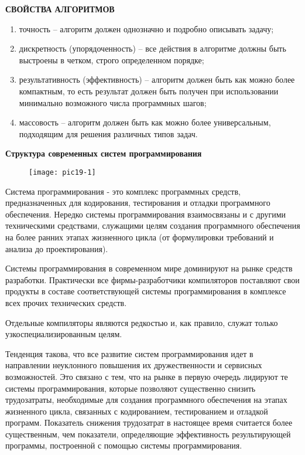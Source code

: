 \begin{center}{\bfseries СВОЙСТВА АЛГОРИТМОВ}
\end{center}

\begin{enumerate}
  \item точность – алгоритм должен однозначно и подробно описывать задачу;
  \item дискретность (упорядоченность) – все действия в алгоритме должны быть выстроены в четком, строго определенном порядке;
  \item результативность (эффективность) – алгоритм должен быть как можно более компактным, то есть результат должен быть получен при использовании минимально возможного числа программных шагов;
  \item массовость – алгоритм должен быть как можно более универсальным, подходящим для решения различных типов задач.
\end{enumerate}

\begin{center}{\bfseries Структура современных систем программирования }
\end{center}

\begin{figure}
  \begin{center}
  \texttt{[image: pic19-1]}
  \end{center}
  \end{figure}

  \begin{opr}
    Система программирования - это комплекс программных средств, предназначенных для кодирования, тестирования и отладки программного обеспечения. Нередко системы программирования взаимосвязаны и с другими техническими средствами, служащими целям создания программного обеспечения на более ранних этапах жизненного цикла (от формулировки требований и анализа до проектирования).
  \end{opr}

  Системы программирования в современном мире доминируют на рынке средств разработки. Практически все фирмы-разработчики компиляторов поставляют свои продукты в составе соответствующей системы программирования в комплексе всех прочих технических средств. 

  Отдельные компиляторы являются редкостью и, как правило, служат только узкоспециализированным целям.

  Тенденция такова, что все развитие систем программирования идет в направлении неуклонного повышения их дружественности и сервисных возможностей. Это связано с тем, что на рынке в первую очередь лидируют те системы программирования, которые позволяют существенно снизить трудозатраты, необходимые для создания программного обеспечения на этапах жизненного цикла, связанных с кодированием, тестированием и отладкой программ. Показатель снижения трудозатрат в настоящее время считается более существенным, чем показатели, определяющие эффективность результирующей программы, построенной с помощью системы программирования.

